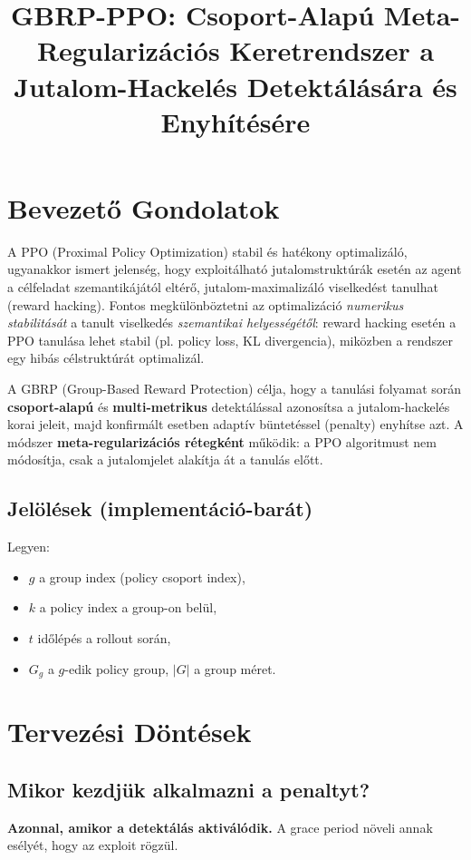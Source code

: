 \documentclass{article}
\title{GBRP-PPO: Csoport-Alapú Meta-Regularizációs Keretrendszer a Jutalom-Hackelés Detektálására és Enyhítésére}
\begin{document}
\maketitle

\section{Bevezető Gondolatok}

A PPO (Proximal Policy Optimization) stabil és hatékony optimalizáló, ugyanakkor ismert jelenség, hogy exploitálható jutalomstruktúrák esetén az agent a célfeladat szemantikájától eltérő, jutalom-maximalizáló viselkedést tanulhat (reward hacking). Fontos megkülönböztetni az optimalizáció \textit{numerikus stabilitását} a tanult viselkedés \textit{szemantikai helyességétől}: reward hacking esetén a PPO tanulása lehet stabil (pl. policy loss, KL divergencia), miközben a rendszer egy hibás célstruktúrát optimalizál.

A GBRP (Group-Based Reward Protection) célja, hogy a tanulási folyamat során \textbf{csoport-alapú} és \textbf{multi-metrikus} detektálással azonosítsa a jutalom-hackelés korai jeleit, majd konfirmált esetben adaptív büntetéssel (penalty) enyhítse azt. A módszer \textbf{meta-regularizációs rétegként} működik: a PPO algoritmust nem módosítja, csak a jutalomjelet alakítja át a tanulás előtt.

\subsection*{Jelölések (implementáció-barát)}
Legyen:
\begin{itemize}
    \item $g$ a group index (policy csoport index),
    \item $k$ a policy index a group-on belül,
    \item $t$ időlépés a rollout során,
    \item $G_g$ a $g$-edik policy group, $|G|$ a group méret.
\end{itemize}

\section{Tervezési Döntések}

\subsection{Mikor kezdjük alkalmazni a penaltyt?}
\textbf{Azonnal, amikor a detektálás aktiválódik.} A grace period növeli annak esélyét, hogy az exploit rögzül.
\end{document}
